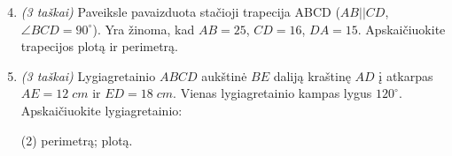 \documentclass[a4paper]{article}
\begin{document}
\begin{minipage}{0.5\textwidth}
      \begin{enumerate}
            \setcounter{enumi}{3} %
            \item \textit{(3 taškai)} Paveiksle pavaizduota stačioji trapecija
                  ABCD
                  ($AB||CD$, $\angle BCD = 90^{\circ}$). Yra žinoma, kad $AB =
                        25$,
                  $CD = 16$,
                  $DA = 15$. Apskaičiuokite trapecijos plotą ir perimetrą.

      \end{enumerate}
\end{minipage}

\begin{enumerate}
      \setcounter{enumi}{4} %
      \item \textit{(3 taškai)} Lygiagretainio $ABCD$ aukštinė $BE$ daliją
            kraštinę $AD$ į atkarpas $AE = 12\;cm$ ir $ED = 18\;cm$. Vienas
            lygiagretainio kampas lygus $120^\circ$. Apskaičiuokite
            lygiagretainio:

            \begin{tasks}[item-format={\normalfont}, after-item-skip=2mm](2)
                  \task perimetrą;
                  \task plotą.
            \end{tasks}
\end{enumerate}
\end{document}
